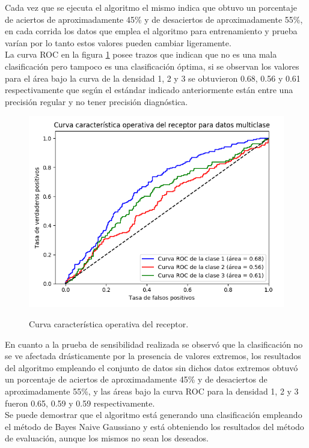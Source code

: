 Cada vez que se ejecuta el algoritmo el mismo indica que obtuvo un porcentaje de aciertos de aproximadamente
45\% y de desaciertos de aproximadamente 55\%, en cada corrida los datos que emplea el algoritmo para entrenamiento
y prueba varían por lo tanto estos valores pueden cambiar ligeramente.\\

La curva ROC en la figura \ref{fig:roc} posee trazos que indican que no es una mala clasificación pero tampoco es una clasificación
óptima, si se observan los valores para el área bajo la curva de la densidad 1, 2 y 3
se obtuvieron 0.68, 0.56 y 0.61 respectivamente que según el estándar indicado anteriormente
están entre una precisión regular y no tener precisión diagnóstica.\\
\clearpage

\begin{figure}[h!]
	\caption{Curva característica operativa del receptor.}
	\centering
	\includegraphics[scale=0.6]{roc.png}
	\label{fig:roc}
\end{figure}

En cuanto a la prueba de sensibilidad realizada se observó que la clasificación no se ve afectada drásticamente por la presencia de valores extremos, los resultados del algoritmo empleando el conjunto de datos sin dichos datos extremos obtuvó un porcentaje de aciertos de aproximadamente 45\% y de desaciertos de aproximadamente 55\%, y las áreas bajo la curva ROC para la densidad 1, 2 y 3 fueron 0.65, 0.59 y 0.59 respectivamente.\\

Se puede demostrar que el algoritmo está generando una clasificación empleando el método de Bayes Naive Gaussiano
y está obteniendo los resultados del método de evaluación, aunque los mismos no sean los deseados.\\

